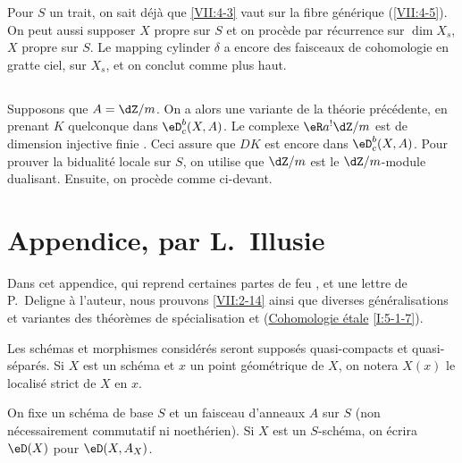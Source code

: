 Pour $S$ un trait, on sait d\'ej\`a que \ref{VII:4-3} vaut sur la fibre 
g\'en\'erique (\ref{VII:4-5}). On peut aussi supposer $X$ propre sur $S$ et on 
proc\`ede par r\'ecurrence sur $\dim{X_s}$, $X$ propre sur $S$. Le mapping 
cylinder $\delta$ a encore des faisceaux de cohomologie en gratte ciel, sur 
$X_s$, et on conclut comme plus haut. 





\subsection{}\label{VII:4-7}

Supposons que $A=\dZ/m$. On a alors une variante de la th\'eorie 
pr\'ec\'edente, en prenant $K$ quelconque dans $\eD_c^b(X,A)$. Le complexe 
$\eR a^! \dZ/m$ est de dimension injective finie \cite[XVIII 3.1.7]{sga4}. Ceci 
assure que $D K$ est encore dans $\eD_c^b(X,A)$. Pour prouver la bidualit\'e 
locale sur $S$, on utilise que $\dZ/m$ est le $\dZ/m$-module dualisant. 
Ensuite, on proc\`ede comme ci-devant. 










\section{Appendice, par L.\ Illusie}\label{VII:5}

Dans cet appendice, qui reprend certaines partes de feu \cite[II]{sga5}, et 
une lettre de P.\ Deligne \`a l'auteur, nous prouvons \ref{VII:2-14} ainsi que 
diverses g\'en\'eralisations et variantes des th\'eor\`emes de sp\'ecialisation 
\cite[XVI 2.1]{sga4} et (\hyperlink{I}{Cohomologie \'etale} \ref{I:5-1-7}). 

Les sch\'emas et morphismes consid\'er\'es seront suppos\'es quasi-compacts et 
quasi-s\'epar\'es. Si $X$ est un sch\'ema et $x$ un point g\'eom\'etrique de 
$X$, on notera $X(x)$ le localis\'e strict de $X$ en $x$. 

On fixe un sch\'ema de base $S$ et un faisceau d'anneaux $A$ sur $S$ (non 
n\'ecessairement commutatif ni noeth\'erien). Si $X$ est un $S$-sch\'ema, on 
\'ecrira $\eD(X)$ pour $\eD(X,A_X)$. 



